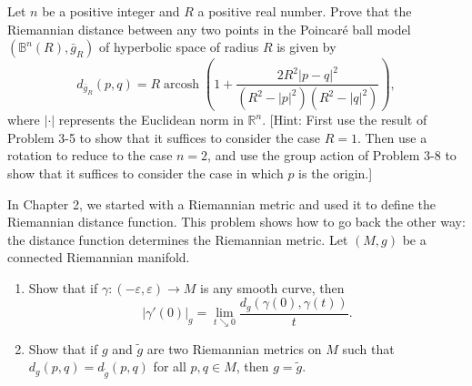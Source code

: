 \begin{exercise}
\label{prob:poincare-ball-distance-formula}

Let $n$ be a positive integer and $R$ a positive real number. Prove that the Riemannian distance between any two points in the Poincaré ball model $(\mathbb{B}^n(R), \bar{g}_R)$ of hyperbolic space of radius $R$ is given by
\[
d_{\bar{g}_R}(p,q) = R \operatorname{arcosh}\left(1 + \frac{2R^2|p-q|^2}{(R^2 - |p|^2)(R^2 - |q|^2)}\right),
\]
where $|\cdot|$ represents the Euclidean norm in $\mathbb{R}^n$. [Hint: First use the result of Problem 3-5 to show that it suffices to consider the case $R = 1$. Then use a rotation to reduce to the case $n = 2$, and use the group action of Problem 3-8 to show that it suffices to consider the case in which $p$ is the origin.]
\end{exercise}

\begin{exercise}
\label{prob:distance-determines-metric}

In Chapter 2, we started with a Riemannian metric and used it to define the Riemannian distance function. This problem shows how to go back the other way: the distance function determines the Riemannian metric. Let $(M, g)$ be a connected Riemannian manifold.
\begin{enumerate}
\item[(a)] Show that if $\gamma: (-\varepsilon, \varepsilon) \to M$ is any smooth curve, then
\[
|\gamma'(0)|_g = \lim_{t \searrow 0} \frac{d_g(\gamma(0), \gamma(t))}{t}.
\]
\item[(b)] Show that if $g$ and $\tilde{g}$ are two Riemannian metrics on $M$ such that $d_g(p,q) = d_{\tilde{g}}(p,q)$ for all $p,q \in M$, then $g = \tilde{g}$.
\end{enumerate}
\end{exercise}

